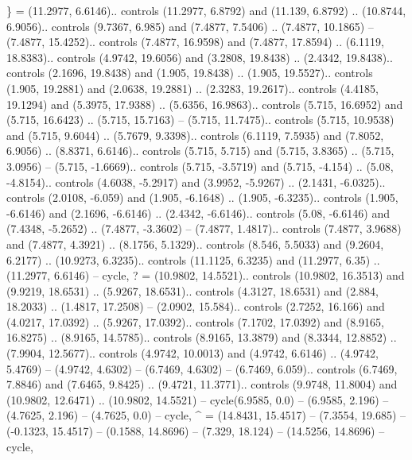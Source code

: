{\}} = {(11.2977, 6.6146).. controls (11.2977, 6.8792) and (11.139, 6.8792) .. (10.8744, 6.9056).. controls (9.7367, 6.985) and (7.4877, 7.5406) .. (7.4877, 10.1865) -- (7.4877, 15.4252).. controls (7.4877, 16.9598) and (7.4877, 17.8594) .. (6.1119, 18.8383).. controls (4.9742, 19.6056) and (3.2808, 19.8438) .. (2.4342, 19.8438).. controls (2.1696, 19.8438) and (1.905, 19.8438) .. (1.905, 19.5527).. controls (1.905, 19.2881) and (2.0638, 19.2881) .. (2.3283, 19.2617).. controls (4.4185, 19.1294) and (5.3975, 17.9388) .. (5.6356, 16.9863).. controls (5.715, 16.6952) and (5.715, 16.6423) .. (5.715, 15.7163) -- (5.715, 11.7475).. controls (5.715, 10.9538) and (5.715, 9.6044) .. (5.7679, 9.3398).. controls (6.1119, 7.5935) and (7.8052, 6.9056) .. (8.8371, 6.6146).. controls (5.715, 5.715) and (5.715, 3.8365) .. (5.715, 3.0956) -- (5.715, -1.6669).. controls (5.715, -3.5719) and (5.715, -4.154) .. (5.08, -4.8154).. controls (4.6038, -5.2917) and (3.9952, -5.9267) .. (2.1431, -6.0325).. controls (2.0108, -6.059) and (1.905, -6.1648) .. (1.905, -6.3235).. controls (1.905, -6.6146) and (2.1696, -6.6146) .. (2.4342, -6.6146).. controls (5.08, -6.6146) and (7.4348, -5.2652) .. (7.4877, -3.3602) -- (7.4877, 1.4817).. controls (7.4877, 3.9688) and (7.4877, 4.3921) .. (8.1756, 5.1329).. controls (8.546, 5.5033) and (9.2604, 6.2177) .. (10.9273, 6.3235).. controls (11.1125, 6.3235) and (11.2977, 6.35) .. (11.2977, 6.6146) -- cycle},
{?} = {(10.9802, 14.5521).. controls (10.9802, 16.3513) and (9.9219, 18.6531) .. (5.9267, 18.6531).. controls (4.3127, 18.6531) and (2.884, 18.2033) .. (1.4817, 17.2508) -- (2.0902, 15.584).. controls (2.7252, 16.166) and (4.0217, 17.0392) .. (5.9267, 17.0392).. controls (7.1702, 17.0392) and (8.9165, 16.8275) .. (8.9165, 14.5785).. controls (8.9165, 13.3879) and (8.3344, 12.8852) .. (7.9904, 12.5677).. controls (4.9742, 10.0013) and (4.9742, 6.6146) .. (4.9742, 5.4769) -- (4.9742, 4.6302) -- (6.7469, 4.6302) -- (6.7469, 6.059).. controls (6.7469, 7.8846) and (7.6465, 9.8425) .. (9.4721, 11.3771).. controls (9.9748, 11.8004) and (10.9802, 12.6471) .. (10.9802, 14.5521) -- cycle(6.9585, 0.0) -- (6.9585, 2.196) -- (4.7625, 2.196) -- (4.7625, 0.0) -- cycle},
{^} = {(14.8431, 15.4517) -- (7.3554, 19.685) -- (-0.1323, 15.4517) -- (0.1588, 14.8696) -- (7.329, 18.124) -- (14.5256, 14.8696) -- cycle},
